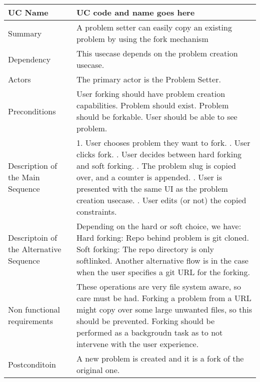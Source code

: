\begin{table}[htbp]
\centering
\begin{tabularx}{\textwidth}{|l|X|}
\hline
UC Name & UC code and name goes here \\ \hline

Summary &  A problem setter can easily copy an existing problem by using the fork mechanism \\ \hline

Dependency & This usecase depends on the problem creation usecase. \\ \hline

Actors & The primary actor is the Problem Setter. \\ \hline

Preconditions & \- User forking should have problem creation capabilities. \newline \- Problem should exist. \newline \- Problem should be forkable. \newline \- User should be able to see problem. \\ \hline

Description of the Main Sequence & 1. User chooses problem they want to fork. \newline 2. User clicks fork. \newline 3. User decides between hard forking and soft forking. \newline 4. The problem slug is copied over, and a counter is appended. \newline 5. User is presented with the same UI as the problem creation usecase. \newline 6. User edits (or not) the copied constraints. \\ \hline

Descriptoin of the Alternative Sequence & Depending on the hard or soft choice, we have: \newline \- Hard forking: Repo behind problem is git cloned. \newline \- Soft forking: The repo directory is only softlinked. \newline Another alternative flow is in the case when the user specifies a git URL for the forking. \\ \hline

Non functional requirements & \- These operations are very file system aware, so care must be had. \newline \- Forking a problem from a URL might copy over some large unwanted files, so this should be prevented. \newline \- Forking should be performed as a backgroudn task as to not intervene with the user experience. \\ \hline

Postconditoin & A new problem is created and it is a fork of the original one. \\ \hline

\end{tabularx}
\end{table}


